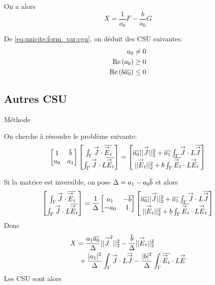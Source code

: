         On a alors
        \begin{equation}
          \label{eq:unicite:form_var:decomp_cgu_ci1_a1_nul}
          X = \frac{1}{a_0}F - \frac{b}{a_0}G
        \end{equation}

        De \eqref{eq:unicite:form_var:cgu}, on déduit des CSU suivantes:
        \begin{align}
          a_0 \not= 0\\
          \operatorname{Re}\left(a_0\right) \ge 0\\
          \operatorname{Re}\left(b{\overline{a_0}}\right) \le 0
        \end{align}

\subsection{Autres CSU}
  Méthode \cite{stupfel_implementation_2015}

  On cherche à résoudre le problème suivante:
  \[
    \begin{bmatrix}
      1 & {\overline{b}} \\
      a_0 & a_1
    \end{bmatrix}
    \begin{bmatrix}
      \int_\Gamma {\overset{\rightarrow}{J}} \cdot {\overline{{\overset{\rightarrow}{E}}_t}} \\
      \int_\Gamma {\overset{\rightarrow}{J}}\cdot L{\overline{{\overset{\rightarrow}{E}}_t}}
    \end{bmatrix}
    =
    \begin{bmatrix}
      {\overline{a_0}}||{\overset{\rightarrow}{J}}||_2^2 + {\overline{a_1}}\int_\Gamma {\overset{\rightarrow}{J}} \cdot L{\overline{{\overset{\rightarrow}{J}}}} \\
      ||{\overset{\rightarrow}{E}}_t||_2^2 + b\int_\Gamma {\overline{{\overset{\rightarrow}{E}}_t}} \cdot L{\overset{\rightarrow}{E}}_t
    \end{bmatrix}
  \]

  Si la matrice est inversible, on pose \(\Delta = a_1 - a_0{\overline{b}}\) et alors
  \[
  \begin{bmatrix}
    \int_\Gamma {\overset{\rightarrow}{J}} \cdot {\overline{{\overset{\rightarrow}{E}}_t}} \\
    \int_\Gamma {\overset{\rightarrow}{J}}\cdot L{\overline{{\overset{\rightarrow}{E}}_t}}
  \end{bmatrix}
  =\dfrac{1}{\Delta}
  \begin{bmatrix}
    a_1 & -{\overline{b}} \\
    -a_0 & 1
  \end{bmatrix}
  \begin{bmatrix}
    {\overline{a_0}}||{\overset{\rightarrow}{J}}||_2^2 + {\overline{a_1}}\int_\Gamma {\overset{\rightarrow}{J}} \cdot L{\overline{{\overset{\rightarrow}{J}}}} \\
    ||{\overset{\rightarrow}{E}}_t||_2^2 + b\int_\Gamma {\overline{{\overset{\rightarrow}{E}}_t}} \cdot L{\overset{\rightarrow}{E}}_t
  \end{bmatrix}
  \]
  Donc
  \begin{align*}
    X &=  \dfrac{a_1{\overline{a_0}}}{\Delta}||{\overset{\rightarrow}{J}}^2||_2^2 - \dfrac{{\overline{b}}}{\Delta}||{\overset{\rightarrow}{E}}_t||_2^2 \\
    &~+\dfrac{|a_1|^2}{\Delta}\int_\Gamma{\overset{\rightarrow}{J}}\cdot L {\overline{{\overset{\rightarrow}{J}}}} - \dfrac{|b|^2}{\Delta}\int_\Gamma{\overline{{\overset{\rightarrow}{E}}_t}}\cdot L{\overset{\rightarrow}{E}}
  \end{align*}
  Les CSU sont alors

